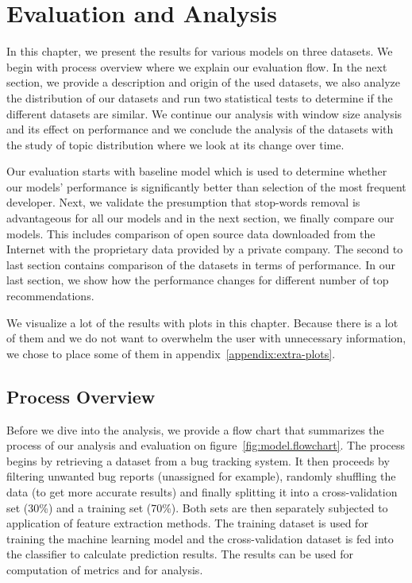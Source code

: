 \chapter{Evaluation and Analysis}
\label{chapter:evaluation}

In this chapter, we present the results for various models on three datasets. We begin with process overview where we explain our evaluation flow. In the next section, we provide a description and origin of the used datasets, we also analyze the distribution of our datasets and run two statistical tests to determine if the different datasets are similar. We continue our analysis with window size analysis and its effect on performance and we conclude the analysis of the datasets with the study of topic distribution where we look at its change over time. 

Our evaluation starts with baseline model which is used to determine whether our models' performance is significantly better than selection of the most frequent developer. Next, we validate the presumption that stop-words removal is advantageous for all our models and in the next section, we finally compare our models. This includes comparison of open source data downloaded from the Internet with the proprietary data provided by a private company. The second to last section contains comparison of the datasets in terms of performance. In our last section, we show how the performance changes for different number of top recommendations.

We visualize a lot of the results with plots in this chapter. Because there is a lot of them and we do not want to overwhelm the user with unnecessary information, we chose to place some of them in appendix~\ref{appendix:extra-plots}.

\section{Process Overview}

Before we dive into the analysis, we provide a flow chart that summarizes the process of our analysis and evaluation on figure~\ref{fig:model.flowchart}. The process begins by retrieving a dataset from a bug tracking system. It then proceeds by filtering unwanted bug reports (unassigned for example), randomly shuffling the data (to get more accurate results) and finally splitting it into a cross-validation set (30\%) and a training set (70\%). Both sets are then separately subjected to application of feature extraction methods. The training dataset is used for training the machine learning model and the cross-validation dataset is fed into the classifier to calculate prediction results. The results can be used for computation of metrics and for analysis.

